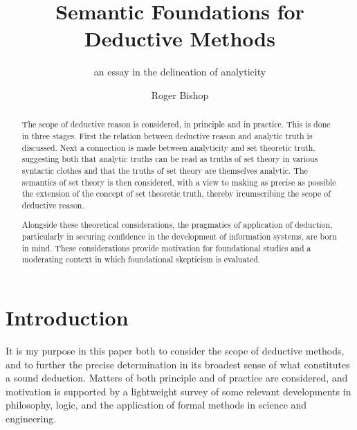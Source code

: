 \documentclass{rbjk}
\newcommand{\ignore}[1]{}
\begin{document}
                                                                                   
\begin{article}
\begin{opening}  
\title{Semantic Foundations for Deductive Methods}
\subtitle{an essay in the delineation of analyticity}
\author{Roger Bishop }

\begin{abstract}

The scope of deductive reason is considered, in principle and in practice.
This is done in three stages.
First the relation between deductive reason and analytic truth is discussed.
Next a connection is made between analyticity and set theoretic truth, suggesting both that analytic truths can be read as truths of set theory in various syntactic clothes and that the truths of set theory are themselves analytic.
The semantics of set theory is then considered, with a view to making as precise as possible the extension of the concept of set theoretic truth, thereby ircumscribing the scope of deductive reason.

Alongside these theoretical considerations, the pragmatics of application of deduction, particularly in securing confidence in the development of information systems, are born in mind.
These considerations provide motivation for foundational studies and a moderating context in which foundational skepticism is evaluated.

\end{abstract}
\end{opening}

\section{Introduction}

It is my purpose in this paper both to consider the scope of deductive methods, and to further the precise determination in its broadest sense of what constitutes a sound deduction.
Matters of both principle and of practice are considered, and motivation is supported by a lightweight survey of some relevant developments in philosophy, logic, and the application of formal methods in science and engineering.

\ignore{

\cite{MacKensie}

\subsection{Some Background}


}
\end{article}
\end{document}
